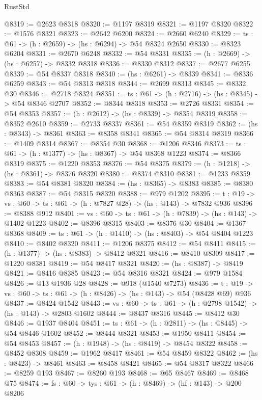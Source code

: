 \begin{lexlean}{RustStd}
\begin{coremodule}
@8319 := @2623 @8318
@8320 := @1197 @8319
@8321 := @1197 @8320
@8322 := @1576 @8321
@8323 := @2642 @6200
@8324 := @2660 @6240
@8329 := {ts : @61} -> (h : @2659) -> (hs : @6294) -> @54 @8324 @2650
@8330 := @8323 @6204
@8331 := @2670 @6248
@8332 := @54 @8331
@8335 := (h : @2669) -> (hs : @6257) -> @8332 @8318
@8336 := @8330 @8312
@8337 := @2677 @6255
@8339 := @54 @8337 @8318
@8340 := (hs : @6261) -> @8339
@8341 := @8336 @6259
@8343 := @54 @8313 @8318
@8344 := @2699 @8313
@8345 := @8332 @30
@8346 := @2718 @8324
@8351 := {ts : @61} -> (h : @2716) -> (hs : @8345) -> @54 @8346 @2707
@8352 := @8344 @8318
@8353 := @2726 @8331
@8354 := @54 @8353
@8357 := (h : @2612) -> (hs : @8339) -> @8354 @8319
@8358 := @8352 @2610
@8359 := @2733 @8337
@8361 := @54 @8359 @8319
@8362 := (hs : @8343) -> @8361
@8363 := @8358 @8341
@8365 := @54 @8314 @8319
@8366 := @1409 @8314
@8367 := @8354 @30
@8368 := @1206 @8346
@8373 := {ts : @61} -> (h : @1377) -> (hs : @8367) -> @54 @8368 @1223
@8374 := @8366 @8319
@8375 := @1220 @8353
@8376 := @54 @8375
@8379 := (h : @1218) -> (hs : @8361) -> @8376 @8320
@8380 := @8374 @8310
@8381 := @1233 @8359
@8383 := @54 @8381 @8320
@8384 := (hs : @8365) -> @8383
@8385 := @8380 @8363
@8387 := @54 @8315 @8320
@8388 := @979 @1202
@8395 := {t : @19} -> {vs : @60} -> {ts : @61} -> (h : @7827 @28) -> (hs : @143) -> @7832 @936
@8396 := @8388 @912
@8401 := {vs : @60} -> {ts : @61} -> (h : @7839) -> (hs : @143) -> @1402 @1223
@8402 := @8396 @8315
@8403 := @8376 @30
@8404 := @1367 @8368
@8409 := {ts : @61} -> (h : @1410) -> (hs : @8403) -> @54 @8404 @1223
@8410 := @8402 @8320
@8411 := @1206 @8375
@8412 := @54 @8411
@8415 := (h : @1377) -> (hs : @8383) -> @8412 @8321
@8416 := @8410 @8309
@8417 := @1220 @8381
@8419 := @54 @8417 @8321
@8420 := (hs : @8387) -> @8419
@8421 := @8416 @8385
@8423 := @54 @8316 @8321
@8424 := @979 @1584
@8426 := @13 @1936 @28
@8428 := @918 (@1540 @7273)
@8436 := {t : @19} -> {vs : @60} -> {ts : @61} -> (h : @8426) -> (hs : @143) -> @54 (@8428 @69) @936
@8437 := @8424 @1542
@8443 := {vs : @60} -> {ts : @61} -> (h : @2798 @1542) -> (hs : @143) -> @2803 @1602
@8444 := @8437 @8316
@8445 := @8412 @30
@8446 := @1937 @8404
@8451 := {ts : @61} -> (h : @2811) -> (hs : @8445) -> @54 @8446 @1602
@8452 := @8444 @8321
@8453 := @1950 @8411
@8454 := @54 @8453
@8457 := (h : @1948) -> (hs : @8419) -> @8454 @8322
@8458 := @8452 @8308
@8459 := @1962 @8417
@8461 := @54 @8459 @8322
@8462 := (hs : @8423) -> @8461
@8463 := @8458 @8421
@8465 := @54 @8317 @8322
@8466 := @8259 @193
@8467 := @8260 @193
@8468 := @65 @8467
@8469 := @8468 @75
@8474 := {fs : @60} -> {tys : @61} -> (h : @8469) -> (hf : @143) -> @200 @8206

\end{coremodule}
\end{lexlean}
